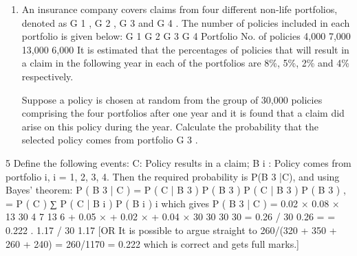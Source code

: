 \documentclass[a4paper,12pt]{article}
\begin{document}
\begin{enumerate}

\item An insurance company covers claims from four different non-life portfolios, denoted as G 1 , G 2 , G 3 and G 4 . The number of policies included in each portfolio is given
below:
G 1
G 2
G 3
G 4
Portfolio
No. of policies 4,000 7,000 13,000 6,000
It is estimated that the percentages of policies that will result in a claim in the following year in each of the portfolios are 8\%, 5\%, 2\% and 4\% respectively.

Suppose a policy is chosen at random from the group of 30,000 policies comprising the four portfolios after one year and it is found that a claim did arise on this policy during the year. Calculate the probability that the selected policy comes from
portfolio G 3 .
\end{enumerate}
\newpage

5
Define the following events:
C: Policy results in a claim;
B i : Policy comes from portfolio i, i = 1, 2, 3, 4.
Then the required probability is P(B 3 |C), and using Bayes’ theorem:
P ( B 3 | C ) =
P ( C | B 3 ) P ( B 3 )
P ( C | B 3 ) P ( B 3 )
,
=
P ( C )
∑ P ( C | B i ) P ( B i )
i
which gives
P ( B 3 | C ) =
0.02 ×
0.08 ×
13
30
4
7
13
6
+ 0.05 × + 0.02 × + 0.04 ×
30
30
30
30
=
0.26 / 30 0.26
=
= 0.222 .
1.17 / 30 1.17
[OR It is possible to argue straight to
260/(320 + 350 + 260 + 240) = 260/1170 = 0.222
which is correct and gets full marks.]
\end{document}
